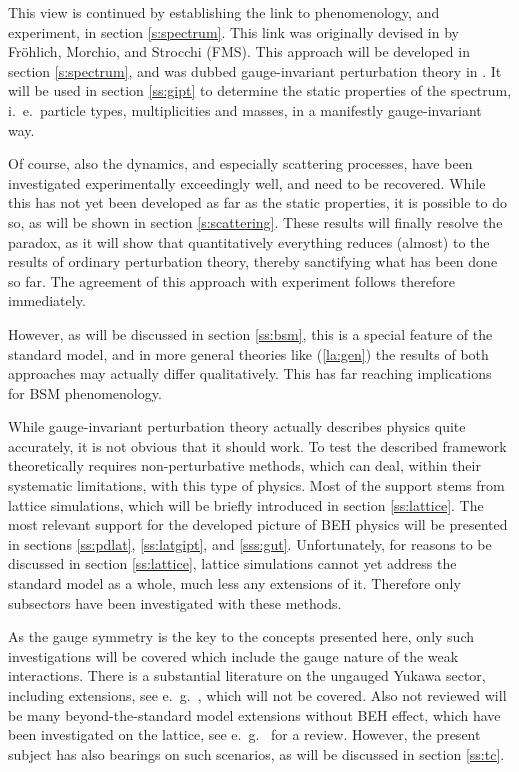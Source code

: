 \documentclass[final,12pt,3p,longtitle]{elsarticle}
\newcommand*{\pref}[1]{(\ref{#1})}
\newcommand*{\1}{1\!\!\!\bot}
\begin{document}
This view is continued by establishing the link to phenomenology, and experiment, in section \ref{s:spectrum}. This link was originally devised in \cite{Frohlich:1980gj,Frohlich:1981yi} by Fr\"ohlich, Morchio, and Strocchi (FMS). This approach will be developed in section \ref{s:spectrum}, and was dubbed gauge-invariant perturbation theory in \cite{Seiler:2015rwa}. It will be used in section \ref{ss:gipt} to determine the static properties of the spectrum, i.\ e.\ particle types, multiplicities and masses, in a manifestly gauge-invariant way.

Of course, also the dynamics, and especially scattering processes, have been investigated experimentally exceedingly well, and need to be recovered. While this has not yet been developed as far as the static properties, it is possible to do so, as will be shown in section \ref{s:scattering}. These results will finally resolve the paradox, as it will show that quantitatively everything reduces (almost) to the results of ordinary perturbation theory, thereby sanctifying what has been done so far. The agreement of this approach with experiment follows therefore immediately.

However, as will be discussed in section \ref{ss:bsm}, this is a special feature of the standard model, and in more general theories like \pref{la:gen} the results of both approaches may actually differ qualitatively. This has far reaching implications for BSM phenomenology.

While gauge-invariant perturbation theory actually describes physics quite accurately, it is not obvious that it should work. To test the described framework theoretically requires non-perturbative methods, which can deal, within their systematic limitations, with this type of physics. Most of the support stems from lattice simulations, which will be briefly introduced in section \ref{ss:lattice}. The most relevant support for the developed picture of BEH physics will be presented in sections \ref{ss:pdlat}, \ref{ss:latgipt}, and \ref{sss:gut}. Unfortunately, for reasons to be discussed in section \ref{ss:lattice}, lattice simulations cannot yet address the standard model as a whole, much less any extensions of it. Therefore only subsectors have been investigated with these methods.

As the gauge symmetry is the key to the concepts presented here, only such investigations will be covered which include the gauge nature of the weak interactions. There is a substantial literature on the ungauged Yukawa sector, including extensions, see e.\ g.\ \cite{Fodor:2007fn,Gerhold:2007gx,Gerhold:2010bh,Gerhold:2011mx,Chu:2015nha,Bulava:2012rb,Gies:2014xha}, which will not be covered. Also not reviewed will be many beyond-the-standard model extensions without BEH effect, which have been investigated on the lattice, see e.\ g.\ \cite{DeGrand:2015zxa} for a review. However, the present subject has also bearings on such scenarios, as will be discussed in section \ref{ss:tc}.
\end{document}
